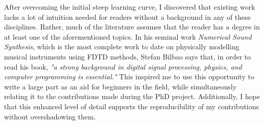 After overcoming the initial steep learning curve, I discovered that existing work lacks a lot of intuition needed for readers without a background in any of these disciplines. Rather, much of the literature assumes that the reader has a degree in at least one of the aforementioned topics. In his seminal work \textit{Numerical Sound Synthesis}, which is the most complete work to date on physically modelling musical instruments using FDTD methods, Stefan Bilbao says that, in order to read his book, \textit{"a strong background in digital signal processing, physics, and computer programming is essential."} This inspired me to use this opportunity to write a large part as an aid for beginners in the field, while simultaneously relating it to the contributions made during the PhD project. Additionally, I hope that this enhanced level of detail supports the reproducibility of my contributions without overshadowing them.













